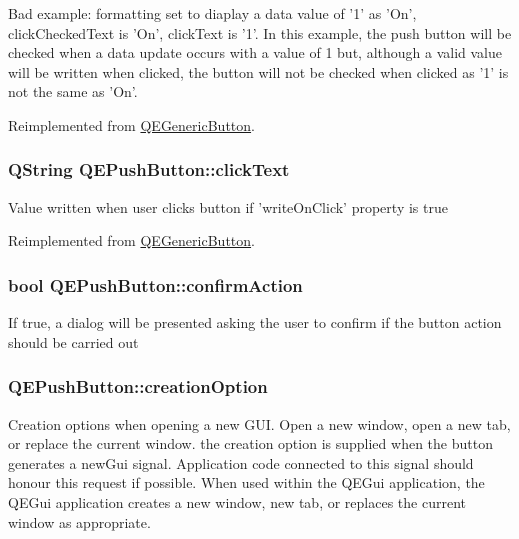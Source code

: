 Bad example: formatting set to diaplay a data value of '1' as 'On', clickCheckedText is 'On', clickText is '1'. In this example, the push button will be checked when a data update occurs with a value of 1 but, although a valid value will be written when clicked, the button will not be checked when clicked as '1' is not the same as 'On'. 

Reimplemented from \hyperlink{classQEGenericButton}{QEGenericButton}.

\hypertarget{classQEPushButton_a0c71a9b133e4452dcfef961becf55fba}{
\subsubsection[{clickText}]{\setlength{\rightskip}{0pt plus 5cm}QString QEPushButton::clickText}}
\label{classQEPushButton_a0c71a9b133e4452dcfef961becf55fba}
Value written when user clicks button if 'writeOnClick' property is true 

Reimplemented from \hyperlink{classQEGenericButton}{QEGenericButton}.

\hypertarget{classQEPushButton_a349efcfb5c1e1a306e4a4b8d90c63966}{
\subsubsection[{confirmAction}]{\setlength{\rightskip}{0pt plus 5cm}bool QEPushButton::confirmAction}}
\label{classQEPushButton_a349efcfb5c1e1a306e4a4b8d90c63966}
If true, a dialog will be presented asking the user to confirm if the button action should be carried out \hypertarget{classQEPushButton_a195284f5eb958b4caaf05c848f12ccf1}{
\subsubsection[{creationOption}]{ QEPushButton::creationOption}}
\label{classQEPushButton_a195284f5eb958b4caaf05c848f12ccf1}
Creation options when opening a new GUI. Open a new window, open a new tab, or replace the current window. the creation option is supplied when the button generates a newGui signal. Application code connected to this signal should honour this request if possible. When used within the QEGui application, the QEGui application creates a new window, new tab, or replaces the current window as appropriate. 

